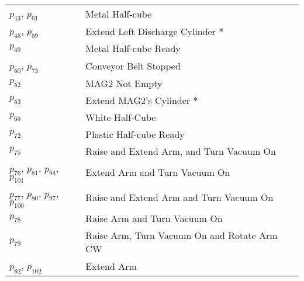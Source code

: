 \begin{longtable}{M{5cm}M{10cm}}
\hyperlink{completeNet:p43}{\hypertarget{completeTable:p43}{$p_{43}$}}, \hyperlink{completeNet:p61}{\hypertarget{completeTable:p61}{$p_{61}$}} & Metal Half-cube\\
\hyperlink{completeNet:p45}{\hypertarget{completeTable:p45}{$p_{45}$}}, \hyperlink{completeNet:p59}{\hypertarget{completeTable:p59}{$p_{59}$}} & Extend Left Discharge Cylinder *\\
\hyperlink{completeNet:p49}{\hypertarget{completeTable:p49}{$p_{49}$}} & Metal Half-cube Ready\\
\hyperlink{completeNet:p50}{\hypertarget{completeTable:p50}{$p_{50}$}}, \hyperlink{completeNet:p73}{\hypertarget{completeTable:p73}{$p_{73}$}} & Conveyor Belt Stopped\\
\hyperlink{completeNet:p52}{\hypertarget{completeTable:p52}{$p_{52}$}} & MAG2 Not Empty\\
\hyperlink{completeNet:p53}{\hypertarget{completeTable:p53}{$p_{53}$}} & Extend MAG2's Cylinder *\\
\hyperlink{completeNet:p65}{\hypertarget{completeTable:p65}{$p_{65}$}} & White Half-Cube\\
\hyperlink{completeNet:p72}{\hypertarget{completeTable:p72}{$p_{72}$}} & Plastic Half-cube Ready\\
\hyperlink{completeNet:p75}{\hypertarget{completeTable:p75}{$p_{75}$}} & Raise and Extend Arm, and Turn Vacuum On\\
\hyperlink{completeNet:p76}{\hypertarget{completeTable:p76}{$p_{76}$}}, \hyperlink{completeNet:p81}{\hypertarget{completeTable:p81}{$p_{81}$}}, \hyperlink{completeNet:p94}{\hypertarget{completeTable:p94}{$p_{94}$}}, \hyperlink{completeNet:p101}{\hypertarget{completeTable:p101}{$p_{101}$}} & Extend Arm and Turn Vacuum On\\
\hyperlink{completeNet:p77}{\hypertarget{completeTable:p77}{$p_{77}$}}, \hyperlink{completeNet:p80}{\hypertarget{completeTable:p80}{$p_{80}$}}, \hyperlink{completeNet:p97}{\hypertarget{completeTable:p97}{$p_{97}$}}, \hyperlink{completeNet:p100}{\hypertarget{completeTable:p100}{$p_{100}$}} & Raise and Extend Arm and Turn Vacuum On\\
\hyperlink{completeNet:p78}{\hypertarget{completeTable:p78}{$p_{78}$}} & Raise Arm and Turn Vacuum On\\
\hyperlink{completeNet:p79}{\hypertarget{completeTable:p79}{$p_{79}$}} & Raise Arm, Turn Vacuum On and Rotate Arm CW\\
\hyperlink{completeNet:p82}{\hypertarget{completeTable:p82}{$p_{82}$}}, \hyperlink{completeNet:p102}{\hypertarget{completeTable:p102}{$p_{102}$}} & Extend Arm\\

\end{longtable}
